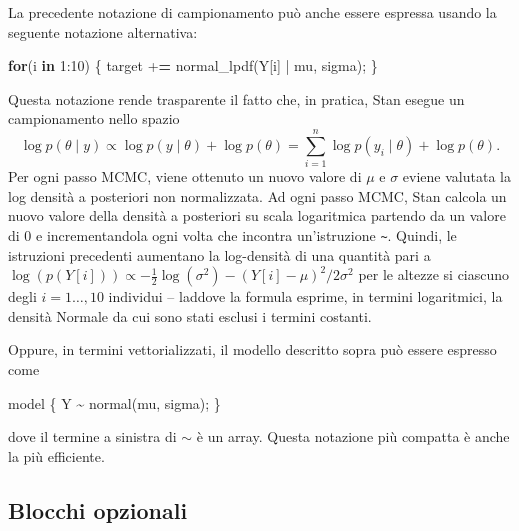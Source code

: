 \documentclass[
]{memoir}
\newenvironment{Shaded}{\begin{snugshade}}{\end{snugshade}}
\newcommand{\ControlFlowTok}[1]{\textcolor[rgb]{0.13,0.29,0.53}{\textbf{#1}}}
\newcommand{\DecValTok}[1]{\textcolor[rgb]{0.00,0.00,0.81}{#1}}
\newcommand{\ErrorTok}[1]{\textcolor[rgb]{0.64,0.00,0.00}{\textbf{#1}}}
\newcommand{\FunctionTok}[1]{\textcolor[rgb]{0.00,0.00,0.00}{#1}}
\newcommand{\NormalTok}[1]{#1}
\newcommand{\SpecialCharTok}[1]{\textcolor[rgb]{0.00,0.00,0.00}{#1}}
\begin{document}
La precedente notazione di campionamento può anche essere espressa usando la seguente notazione alternativa:

\begin{Shaded}
\begin{Highlighting}[]
  \ControlFlowTok{for}\NormalTok{(i }\ControlFlowTok{in} \DecValTok{1}\SpecialCharTok{:}\DecValTok{10}\NormalTok{) \{}
\NormalTok{    target }\SpecialCharTok{+}\ErrorTok{=} \FunctionTok{normal\_lpdf}\NormalTok{(Y[i] }\SpecialCharTok{|}\NormalTok{ mu, sigma);}
\NormalTok{  \}}
\end{Highlighting}
\end{Shaded}

\noindent
Questa notazione rende trasparente il fatto che, in pratica, Stan esegue un campionamento nello spazio
\[
\log p(\theta \mid y) \propto \log p(y \mid \theta) + \log p(\theta) = \sum_{i=1}^n \log p(y_i \mid \theta) + \log p(\theta).
\]
Per ogni passo MCMC, viene ottenuto un nuovo valore di \(\mu\) e \(\sigma\) eviene valutata la log densità a posteriori non normalizzata. Ad ogni passo MCMC, Stan calcola un nuovo valore della densità a posteriori su scala logaritmica partendo da un valore di 0 e incrementandola ogni volta che incontra un'istruzione \texttt{\textasciitilde{}}. Quindi, le istruzioni precedenti aumentano la log-densità di una quantità pari a \(\log (p(Y[i])) \propto -\frac{1}{2} \log(\sigma^2) - (Y[i]-\mu)^2 / 2\sigma^2\) per le altezze si ciascuno degli \(i=1 \dots, 10\) individui -- laddove la formula esprime, in termini logaritmici, la densità Normale da cui sono stati esclusi i termini costanti.

Oppure, in termini vettorializzati, il modello descritto sopra può essere espresso come

\begin{Shaded}
\begin{Highlighting}[]
\NormalTok{model \{}
\NormalTok{  Y }\SpecialCharTok{\textasciitilde{}} \FunctionTok{normal}\NormalTok{(mu, sigma);}
\NormalTok{\}}
\end{Highlighting}
\end{Shaded}

\noindent
dove il termine a sinistra di \(\sim\) è un array. Questa notazione più compatta è anche la più efficiente.

\hypertarget{blocchi-opzionali}{%
\subsection{Blocchi opzionali}\label{blocchi-opzionali}}
\end{document}
